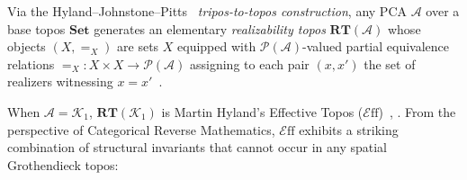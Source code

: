\documentclass[10pt,twoside,openright]{book}
\theoremstyle{crmplain}
\theoremstyle{crmdef}
\theoremstyle{crmremark}
\newcommand{\Eff}{\mathcal{E}\mathrm{ff}}
\begin{document}
Via the Hyland--Johnstone--Pitts~\cite[pp.~205--232]{HJP80} \emph{tripos-to-topos construction}, any PCA $\mathcal{A}$ over a base topos $\mathbf{Set}$ generates an elementary \emph{realizability topos} $\mathbf{RT}(\mathcal{A})$ whose objects $(X, =_X)$ are sets $X$ equipped with $\mathcal{P}(\mathcal{A})$-valued partial equivalence relations $=_X: X \times X \to \mathcal{P}(\mathcal{A})$ assigning to each pair $(x, x')$ the set of realizers witnessing $x = x'$~\cite[Ch.~2, \S\S 2.1--2.2]{vanOosten08}.

When $\mathcal{A} = \mathcal{K}_1$, $\mathbf{RT}(\mathcal{K}_1)$ is Martin Hyland's Effective Topos ($\Eff$)~\cite[pp.~165--216]{Hyland82}, \cite[Chs.~2--3]{vanOosten08}. From the perspective of Categorical Reverse Mathematics, $\Eff$ exhibits a striking combination of structural invariants that cannot occur in any spatial Grothendieck topos:
\end{document}
